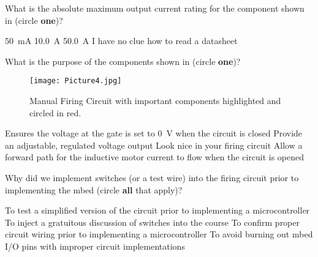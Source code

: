\documentclass[addpoints,answers]{exam}
\begin{document}
\begin{questions}
\clearpage
\question
What is the absolute maximum output current rating for the component shown in  (circle {\bf one})?
\begin{choices}
\choice \SI{50}{\milli\ampere}
\choice \SI{10.0}{\ampere}
\CorrectChoice \SI{50.0}{\ampere}
\choice I have no clue how to read a datasheet
\end{choices}






\question
What is the purpose of the components shown in  (circle {\bf one})?
\begin{figure}[h]
\centering
	\texttt{[image: Picture4.jpg]}
	\caption{Manual Firing Circuit with important components highlighted and circled in red.}
	\label{fig:pulldown}
\end{figure}
\begin{choices}
\choice Ensures the voltage at the gate is set to \SI{0}{\volt} when the circuit is closed
\choice Provide an adjustable, regulated voltage output  
\choice Look nice in your firing circuit
\CorrectChoice Allow a forward path for the inductive motor current to flow when the circuit is opened
\end{choices}












\question
Why did we implement switches (or a test wire) into the firing circuit prior to implementing the mbed (circle {\bf all} that apply)?
\begin{choices}
\CorrectChoice To test a simplified version of the circuit prior to implementing a microcontroller
\choice To inject a gratuitous discussion of switches into the course
\CorrectChoice To confirm proper circuit wiring prior to implementing a microcontroller
\CorrectChoice To avoid burning out mbed I/O pins with improper circuit implementations
\end{choices}







\end{questions}
\end{document}
